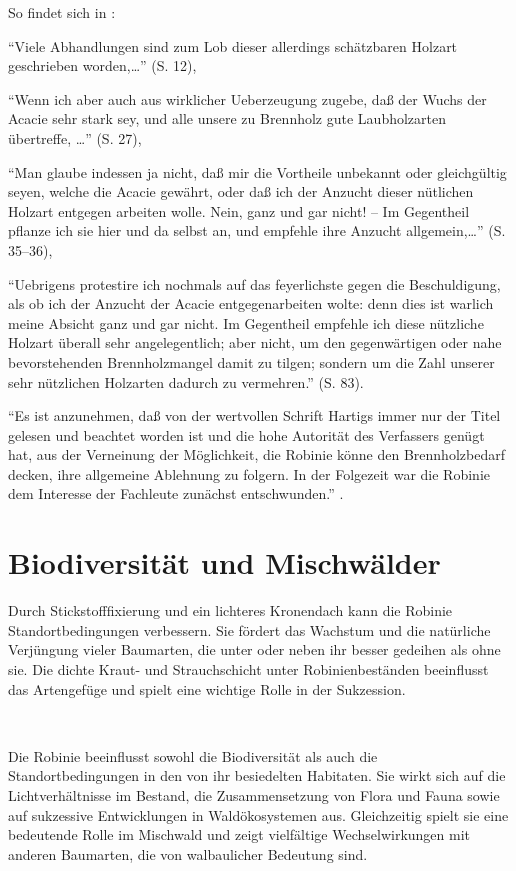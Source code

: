 \documentclass[twocolumn]{scrartcl}
\makeatletter
\newcommand{\summary}[1]{%
  \par %
  {\small\sffamily
    \noindent #1\par}
  \vspace{-0.4em}
  \noindent\makebox[\linewidth]{\rule{0.33\linewidth}{0.4pt}}\\[-1.2em]
  \@afterindentfalse\@afterheading
}
\makeatother
\begin{document}
So findet sich in \citet{hartig1798robinie}:

\enquote{Viele Abhandlungen sind zum Lob dieser allerdings schätzbaren
  Holzart geschrieben worden,\dots} (S. 12),

\enquote{Wenn ich aber auch aus wirklicher Ueberzeugung zugebe, daß
  der Wuchs der Acacie sehr stark sey, und alle unsere zu Brennholz
  gute Laubholzarten übertreffe, \dots} (S. 27),

\enquote{Man glaube indessen ja nicht, daß mir die Vortheile unbekannt
  oder gleichgültig seyen, welche die Acacie gewährt, oder daß ich der
  Anzucht dieser nütlichen Holzart entgegen arbeiten wolle.  Nein,
  ganz und gar nicht! -- Im Gegentheil pflanze ich sie hier und da
  selbst an, und empfehle ihre Anzucht allgemein,\dots} (S. 35--36),

\enquote{Uebrigens protestire ich nochmals auf das feyerlichste gegen
  die Beschuldigung, als ob ich der Anzucht der Acacie
  entgegenarbeiten wolte: denn dies ist warlich meine Absicht ganz und
  gar nicht. Im Gegentheil empfehle ich diese nützliche Holzart
  überall sehr angelegentlich; aber nicht, um den gegenwärtigen oder
  nahe bevorstehenden Brennholzmangel damit zu tilgen; sondern um die
  Zahl unserer sehr nützlichen Holzarten dadurch zu vermehren.}
(S. 83).

\enquote{Es ist anzunehmen, daß von der wertvollen Schrift Hartigs
  immer nur der Titel gelesen und beachtet worden ist und die hohe
  Autorität des Verfassers genügt hat, aus der Verneinung der
  Möglichkeit, die Robinie könne den Brennholzbedarf decken, ihre
  allgemeine Ablehnung zu folgern. In der Folgezeit war die Robinie
  dem Interesse der Fachleute zunächst entschwunden.}
\citep{erteld1952robinieErtrag}.


\section{Biodiversität und Mischwälder}

\summary{Durch Stickstofffixierung und ein lichteres Kronendach kann
  die Robinie Standortbedingungen verbessern. Sie fördert das Wachstum
  und die natürliche Verjüngung vieler Baumarten, die unter oder neben
  ihr besser gedeihen als ohne sie. Die dichte Kraut- und
  Strauchschicht unter Robinienbeständen beeinflusst das Artengefüge
  und spielt eine wichtige Rolle in der Sukzession.}

Die Robinie beeinflusst sowohl die Biodiversität als auch die
Standortbedingungen in den von ihr besiedelten Habitaten. Sie wirkt
sich auf die Lichtverhältnisse im Bestand, die Zusammensetzung von
Flora und Fauna sowie auf sukzessive Entwicklungen in Waldökosystemen
aus. Gleichzeitig spielt sie eine bedeutende Rolle im Mischwald und
zeigt vielfältige Wechselwirkungen mit anderen Baumarten, die von
walbaulicher Bedeutung sind.
\end{document}
